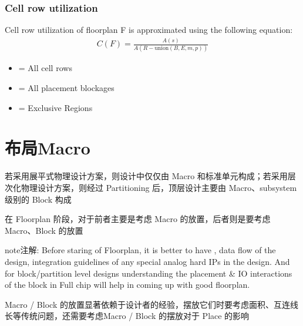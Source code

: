 \documentclass[letterpaper,10pt,english]{sphinxmanual}
\begin{document}
\subsubsection{Cell row utilization}
\label{\detokenize{chapter5/_u786e_u5b9a_u82af_u7247_u9762_u79ef:cell-row-utilization}}
\sphinxAtStartPar
Cell row utilization  of floorplan F is approximated using the following equation:
\begin{equation}\label{equation:chapter5/确定芯片面积:math-single}
\begin{split}C(F) = \frac{A(s)}{A(R -\text{union}(B, E, m, p))}\end{split}
\end{equation}\begin{itemize}
\item {} 
\sphinxAtStartPar
{} = All cell rows

\item {} 
\sphinxAtStartPar
{} = All placement blockages

\item {} 
\sphinxAtStartPar
{} = Exclusive Regions

\end{itemize}


\section{布局Macro}
\label{\detokenize{chapter5/_u5e03_u5c40Macro:macro}}\label{\detokenize{chapter5/_u5e03_u5c40Macro::doc}}
\sphinxAtStartPar
若采用展平式物理设计方案，则设计中仅仅由 Macro 和标准单元构成；若采用层次化物理设计方案，则经过 Partitioning 后，顶层设计主要由 Macro、sub\sphinxhyphen{}system级别的 Block 构成

\sphinxAtStartPar
在 Floorplan 阶段，对于前者主要是考虑 Macro 的放置，后者则是要考虑 Macro、Block 的放置

\begin{sphinxadmonition}{note}{注解:}
\sphinxAtStartPar
Before staring of Floorplan, it is better to have  , data flow of the design, integration guidelines of any special analog hard IPs in the design. And for block/partition level designs understanding the placement \& IO interactions of the block in Full chip will help in coming up with good floorplan.
\end{sphinxadmonition}

\sphinxAtStartPar
Macro / Block 的放置显著依赖于设计者的经验，摆放它们时要考虑面积、互连线长等传统问题，还需要考虑Macro / Block 的摆放对于 Place 的影响
\end{document}
